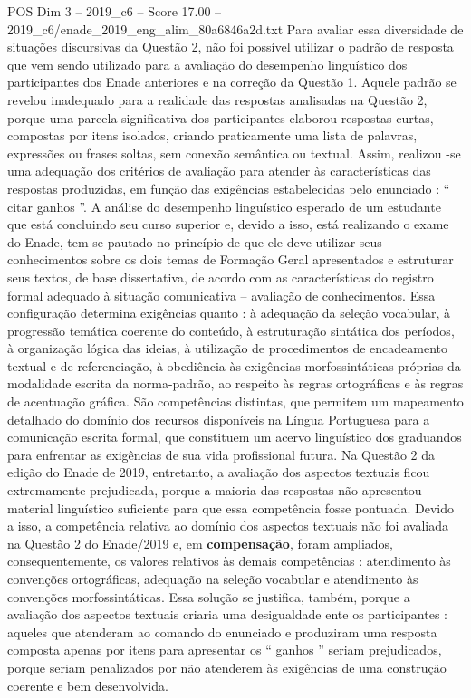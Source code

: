 \begin{textsample}{POS Dim 3 – 2019\_c6 – Score 17.00 – 2019\_c6/enade\_2019\_eng\_alim\_80a6846a2d.txt}
Para avaliar essa diversidade de situações discursivas da Questão 2, não foi possível utilizar o padrão de resposta que vem sendo utilizado para a avaliação do desempenho linguístico dos participantes dos Enade anteriores e na correção da Questão 1.
Aquele padrão se revelou inadequado para a realidade das respostas analisadas na Questão 2, porque uma parcela significativa dos participantes elaborou respostas curtas, compostas por itens isolados, criando praticamente uma lista de palavras, expressões ou frases soltas, sem conexão semântica ou textual.
Assim, realizou -se uma adequação dos critérios de avaliação para atender às características das respostas produzidas, em função das exigências estabelecidas pelo enunciado : “ citar ganhos ”.
A análise do desempenho linguístico esperado de um estudante que está concluindo seu curso superior e, devido a isso, está realizando o exame do Enade, tem se pautado no princípio de que ele deve utilizar seus conhecimentos sobre os dois temas de Formação Geral apresentados e estruturar seus textos, de base dissertativa, de acordo com as características do registro formal adequado à situação comunicativa – avaliação de conhecimentos.
Essa configuração determina exigências quanto : à adequação da seleção vocabular, à progressão temática coerente do conteúdo, à estruturação sintática dos períodos, à organização lógica das ideias, à utilização de procedimentos de encadeamento textual e de referenciação, à obediência às exigências morfossintáticas próprias da modalidade escrita da norma-padrão, ao respeito às regras ortográficas e às regras de acentuação gráfica.
São competências distintas, que permitem um mapeamento detalhado do domínio dos recursos disponíveis na Língua Portuguesa para a comunicação escrita formal, que constituem um acervo linguístico dos graduandos para enfrentar as exigências de sua vida profissional futura.
Na Questão 2 da edição do Enade de 2019, entretanto, a avaliação dos aspectos textuais ficou extremamente prejudicada, porque a maioria das respostas não apresentou material linguístico suficiente para que essa competência fosse pontuada.
Devido a isso, a competência relativa ao domínio dos aspectos textuais não foi avaliada na Questão 2 do Enade/2019 e, em \textbf{compensação}, foram ampliados, consequentemente, os valores relativos às demais competências : atendimento às convenções ortográficas, adequação na seleção vocabular e atendimento às convenções morfossintáticas.
Essa solução se justifica, também, porque a avaliação dos aspectos textuais criaria uma desigualdade ente os participantes : aqueles que atenderam ao comando do enunciado e produziram uma resposta composta apenas por itens para apresentar os “ ganhos ” seriam prejudicados, porque seriam penalizados por não atenderem às exigências de uma construção coerente e bem desenvolvida.

\end{textsample}
